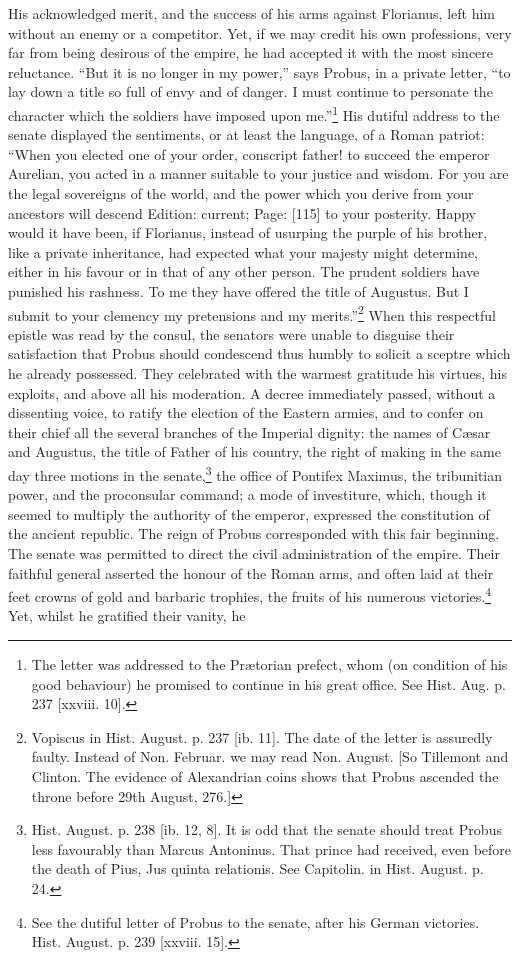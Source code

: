 His acknowledged merit, and the success of his arms against Florianus, left him without an enemy or a competitor. Yet, if we may credit his own professions, very far from being desirous of the empire, he had accepted it with the most sincere reluctance. \texthebrew{“}But it is no longer in my power,\texthebrew{}” says Probus, in a private letter, \texthebrew{“}to lay down a title so full of envy and of danger. I must continue to personate the character which the soldiers have imposed upon me.\texthebrew{}”\footnote{The letter was addressed to the Prætorian prefect, whom (on condition of his good behaviour) he promised to continue in his great office. See Hist. Aug. p. 237 [xxviii. 10].} His dutiful address to the senate displayed the sentiments, or at least the language, of a Roman patriot: \texthebrew{“}When you elected one of your order, conscript father! to succeed the emperor Aurelian, you acted in a manner suitable to your justice and wisdom. For you are the legal sovereigns of the world, and the power which you derive from your ancestors will descend Edition: current; Page: [115] to your posterity. Happy would it have been, if Florianus, instead of usurping the purple of his brother, like a private inheritance, had expected what your majesty might determine, either in his favour or in that of any other person. The prudent soldiers have punished his rashness. To me they have offered the title of Augustus. But I submit to your clemency my pretensions and my merits.\texthebrew{}”\footnote{Vopiscus in Hist. August. p. 237 [ib. 11]. The date of the letter is assuredly faulty. Instead of Non. Februar. we may read Non. August. [So Tillemont and Clinton. The evidence of Alexandrian coins shows that Probus ascended the throne before 29th August, 276.]} When this respectful epistle was read by the consul, the senators were unable to disguise their satisfaction that Probus should condescend thus humbly to solicit a sceptre which he already possessed. They celebrated with the warmest gratitude his virtues, his exploits, and above all his moderation. A decree immediately passed, without a dissenting voice, to ratify the election of the Eastern armies, and to confer on their chief all the several branches of the Imperial dignity: the names of Cæsar and Augustus, the title of Father of his country, the right of making in the same day three motions in the senate,\footnote{Hist. August. p. 238 [ib. 12, 8]. It is odd that the senate should treat Probus less favourably than Marcus Antoninus. That prince had received, even before the death of Pius, Jus quinta relationis. See Capitolin. in Hist. August. p. 24.} the office of Pontifex Maximus, the tribunitian power, and the proconsular command; a mode of investiture, which, though it seemed to multiply the authority of the emperor, expressed the constitution of the ancient republic. The reign of Probus corresponded with this fair beginning. The senate was permitted to direct the civil administration of the empire. Their faithful general asserted the honour of the Roman arms, and often laid at their feet crowns of gold and barbaric trophies, the fruits of his numerous victories.\footnote{See the dutiful letter of Probus to the senate, after his German victories. Hist. August. p. 239 [xxviii. 15].} Yet, whilst he gratified their vanity, he 